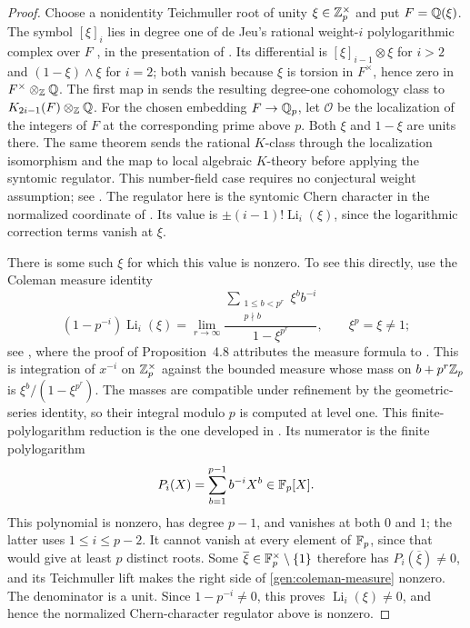 \begin{proof}
Choose a nonidentity Teichmuller root of unity $\xi\in\mathbb Z_p^\times$
and put $F=\mathbb Q(\xi)$.  The symbol $[\xi]_i$ lies in degree one of
de Jeu's rational weight-$i$ polylogarithmic complex over $F$
\cite{DeJeuWedge}, in the presentation of
\cite[p.~868]{BesserDeJeu}.  Its differential is
$[\xi]_{i-1}\otimes\xi$ for $i>2$ and $(1-\xi)\wedge\xi$ for $i=2$;
both vanish because $\xi$ is torsion in $F^\times$, hence zero in
$F^\times\otimes_\mathbb Z\mathbb Q$.  The first map in
\cite[Theorem~1.12]{BesserDeJeu} sends the resulting degree-one
cohomology class to $K_{2i-1}(F)\otimes_\mathbb Z\mathbb Q$.  For the chosen
embedding $F\to\mathbb Q_p$, let $\mathcal O$ be the localization of the
integers of $F$ at the corresponding prime above $p$.  Both $\xi$ and
$1-\xi$ are units there.  The same theorem sends the rational
$K$-class through the localization isomorphism and the map to local
algebraic $K$-theory before applying the syntomic regulator.  This
number-field case requires no conjectural weight assumption; see
\cite[p.~871, the paragraph preceding Theorem~1.10, and Remark~1.13]
{BesserDeJeu}.
The regulator here is the syntomic Chern character in the normalized
coordinate of \cite[Definition~4.6 and Appendix~A]{BesserDeJeu}.
Its value is $\pm(i-1)!\operatorname{Li}_i(\xi)$, since the logarithmic
correction terms vanish at $\xi$.

There is some such $\xi$ for which this value is nonzero.  To see
this directly, use the Coleman measure identity
\begin{equation}\label{gen:coleman-measure}
 (1-p^{-i})\operatorname{Li}_i(\xi)
  =\lim_{r\to\infty}
    \frac{\displaystyle
       \sum_{\substack{1\leq b<p^r\\p\nmid b}}\xi^b b^{-i}}
         {1-\xi^{p^r}},
 \qquad \xi^p=\xi\neq1;
\end{equation}
see \cite[Proposition~4.8 and Corollary~4.9]{BesserDeJeuAlgorithm},
where the proof of Proposition~4.8 attributes the measure formula to
\cite[Lemma~7.2]{Coleman}.
This is integration of $x^{-i}$ on
$\mathbb Z_p^\times$ against the bounded measure whose mass on
$b+p^r\mathbb Z_p$ is $\xi^b/(1-\xi^{p^r})$.
The masses are compatible under refinement by the geometric-series
identity, so their integral modulo $p$ is computed at level one.
This finite-polylogarithm reduction is the one developed in
\cite[Proposition~2.1 and Corollary~2.2]{BesserFinitePolylog}.
Its numerator is the finite polylogarithm
\[
 P_i(X)=\sum_{b=1}^{p-1} b^{-i}X^b\in\mathbb F_p[X].
\]
This polynomial is nonzero, has degree $p-1$, and vanishes at both
$0$ and $1$; the latter uses $1\leq i\leq p-2$.
It cannot vanish at every element of $\mathbb F_p$, since that would give
at least $p$ distinct roots.  Some
$\overline\xi\in\mathbb F_p^\times\setminus\{1\}$ therefore has
$P_i(\overline\xi)\neq0$, and its Teichmuller lift makes the
right side of \eqref{gen:coleman-measure} nonzero.  The denominator
is a unit.  Since $1-p^{-i}\ne0$, this proves
$\operatorname{Li}_i(\xi)\ne0$, and hence the normalized
Chern-character regulator above is nonzero.


\end{proof}
